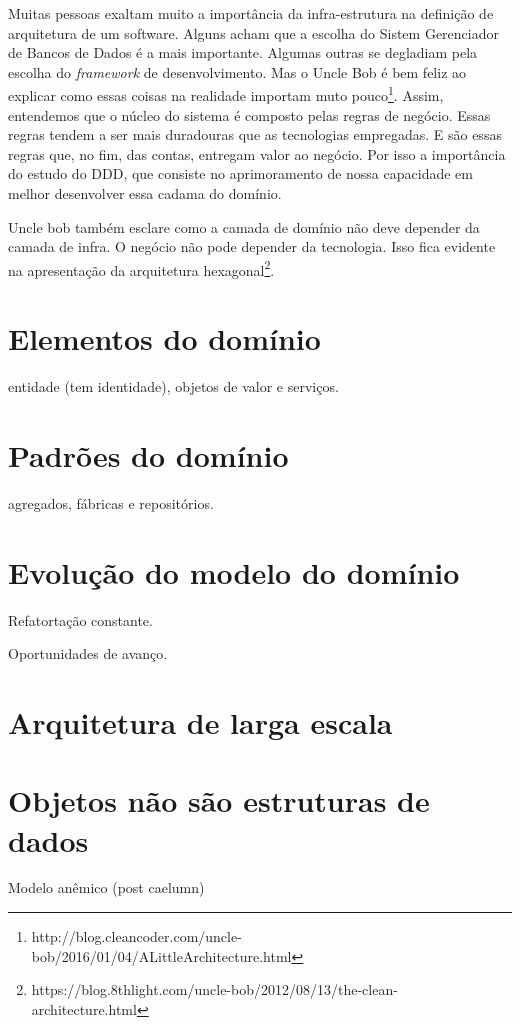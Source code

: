 \documentclass[a4paper, 12pt]{article}
\begin{document}
Muitas pessoas exaltam muito a importância da infra-estrutura na definição de arquitetura de um software. Alguns acham que a escolha do Sistem Gerenciador de Bancos de Dados é a mais importante. Algumas outras se degladiam pela escolha do \emph{framework} de desenvolvimento. Mas o Uncle Bob é bem feliz ao explicar como essas coisas na realidade importam muto pouco\footnote{http://blog.cleancoder.com/uncle-bob/2016/01/04/ALittleArchitecture.html}. Assim, entendemos que o núcleo do sistema é composto pelas regras de negócio. Essas regras tendem a ser mais duradouras que as tecnologias empregadas. E são essas regras que, no fim, das contas, entregam valor ao negócio. Por isso a importância do estudo do DDD, que consiste no aprimoramento de nossa capacidade em melhor desenvolver essa cadama do domínio.

Uncle bob também esclare como a camada de domínio não deve depender da camada de infra. O negócio não pode depender da tecnologia. Isso fica evidente na apresentação da arquitetura hexagonal\footnote{https://blog.8thlight.com/uncle-bob/2012/08/13/the-clean-architecture.html}.

\section{Elementos do domínio}

entidade (tem identidade), objetos de valor e serviços.

\section{Padrões do domínio}

agregados, fábricas e repositórios.

\section{Evolução do modelo do domínio}

Refatortação constante.

Oportunidades de avanço.

\section{Arquitetura de larga escala}

\section{Objetos não são estruturas de dados}

Modelo anêmico (post caelumn)
\end{document}
